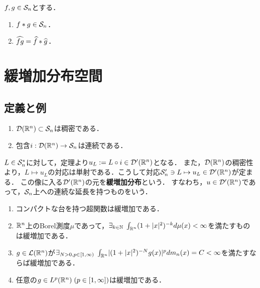 \documentclass[uplatex,dvipdfmx]{jsreport}
\begin{document}
\begin{theorem}
    $f,g\in\S_n$とする．
    \begin{enumerate}
        \item $f*g\in\S_n$．
        \item $\wh{fg}=\wh{f}*\wh{g}$．
    \end{enumerate}
\end{theorem}

\section{緩増加分布空間}

\subsection{定義と例}

\begin{theorem}\mbox{}
    \begin{enumerate}
        \item $\D(\R^n)\subset\S_n$は稠密である．
        \item 包含$i:\D(\R^n)\to\S_n$は連続である．
    \end{enumerate}
\end{theorem}

\begin{definition}
    $L\in\S_n^*$に対して，定理より$u_L:=L\circ i\in\D'(\R^n)$となる．
    また，$\D(\R^n)$の稠密性より，$L\mapsto u_L$の対応は単射である．こうして対応$\S'_n\ni L\mapsto u_L\in\D'(\R^n)$が定まる．
    この像に入る$\D'(\R^n)$の元を\textbf{緩増加分布}という．
    すなわち，$u\in\D'(\R^n)$であって，$\S_n$上への連続な延長を持つものをいう．
\end{definition}

\begin{example}[任意の可積分関数は緩増加である]\mbox{}
    \begin{enumerate}
        \item コンパクトな台を持つ超関数は緩増加である．
        \item $\R^n$上のBorel測度$\mu$であって，$\exists_{k\in\N}\;\int_{\R^n}(1+\abs{x}^2)^{-k}d\mu(x)<\infty$を満たすものは緩増加である．
        \item $g\in\L(\R^n)$が$\exists_{N>0,p\in[1,\infty)}\;\int_{\R^n}\abs{(1+\abs{x}^2)^{-N}g(x)}^pdm_n(x)=C<\infty$を満たすならば緩増加である．
        \item 任意の$g\in L^p(\R^n)\;(p\in[1,\infty])$は緩増加である．
    \end{enumerate}
\end{example}
\end{document}

